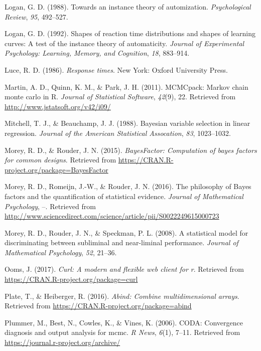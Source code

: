 \documentclass[english,man]{apa6}
\theoremstyle{definition}
\theoremstyle{definition}
\theoremstyle{remark}
\begin{document}
\hypertarget{ref-Logan:1988}{}
Logan, G. D. (1988). Towards an instance theory of automization.
\emph{Psychological Review}, \emph{95}, 492--527.

\hypertarget{ref-Logan:1992}{}
Logan, G. D. (1992). Shapes of reaction time distributions and shapes of
learning curves: A test of the instance theory of automaticity.
\emph{Journal of Experimental Psychology: Learning, Memory, and
Cognition}, \emph{18}, 883--914.

\hypertarget{ref-Luce:1986}{}
Luce, R. D. (1986). \emph{Response times}. New York: Oxford University
Press.

\hypertarget{ref-R-MCMCpack}{}
Martin, A. D., Quinn, K. M., \& Park, J. H. (2011). MCMCpack: Markov
chain monte carlo in R. \emph{Journal of Statistical Software},
\emph{42}(9), 22. Retrieved from \url{http://www.jstatsoft.org/v42/i09/}

\hypertarget{ref-Mitchell:Beauchamp:1988}{}
Mitchell, T. J., \& Beauchamp, J. J. (1988). Bayesian variable selection
in linear regression. \emph{Journal of the American Statistical
Assocation}, \emph{83}, 1023--1032.

\hypertarget{ref-R-BayesFactor}{}
Morey, R. D., \& Rouder, J. N. (2015). \emph{BayesFactor: Computation of
bayes factors for common designs}. Retrieved from
\url{https://CRAN.R-project.org/package=BayesFactor}

\hypertarget{ref-Morey:etal:2016}{}
Morey, R. D., Romeijn, J.-W., \& Rouder, J. N. (2016). The philosophy of
Bayes factors and the quantification of statistical evidence.
\emph{Journal of Mathematical Psychology}, --. Retrieved from
\url{http://www.sciencedirect.com/science/article/pii/S0022249615000723}

\hypertarget{ref-Morey:etal:2008a}{}
Morey, R. D., Rouder, J. N., \& Speckman, P. L. (2008). A statistical
model for discriminating between subliminal and near-liminal
performance. \emph{Journal of Mathematical Psychology}, \emph{52},
21--36.

\hypertarget{ref-R-curl}{}
Ooms, J. (2017). \emph{Curl: A modern and flexible web client for r}.
Retrieved from \url{https://CRAN.R-project.org/package=curl}

\hypertarget{ref-R-abind}{}
Plate, T., \& Heiberger, R. (2016). \emph{Abind: Combine
multidimensional arrays}. Retrieved from
\url{https://CRAN.R-project.org/package=abind}

\hypertarget{ref-R-coda}{}
Plummer, M., Best, N., Cowles, K., \& Vines, K. (2006). CODA:
Convergence diagnosis and output analysis for mcmc. \emph{R News},
\emph{6}(1), 7--11. Retrieved from
\url{https://journal.r-project.org/archive/}
\end{document}
